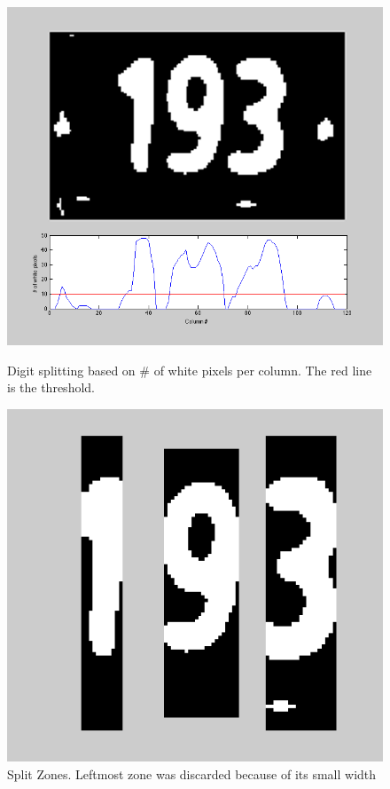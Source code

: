 \documentclass{article} %
\begin{document}
\begin{figure}[!htb]
  \includegraphics[width=\linewidth]{images/image08}
  \caption{Digit splitting based on # of white pixels per column. The red line is the threshold.}
  \label{fig:thres}
\endminipage\hfill
{}
  \includegraphics[width=\linewidth]{images/image04}
  \caption{Split Zones. Leftmost zone was discarded because of its small width}
  \label{fig:split}
\endminipage\hfill
\end{figure}
\end{document}
